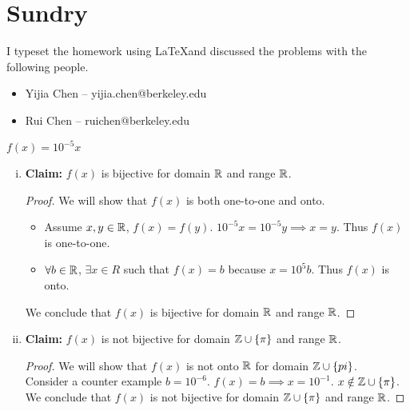 \documentclass[11pt]{article}
\begin{document}
\section*{Sundry}

\begin{Answer}
    I typeset the homework using \LaTeX and discussed the problems with the following people. 
    \begin{itemize}
        \item Yijia Chen -- yijia.chen@berkeley.edu
        \item Rui Chen -- ruichen@berkeley.edu
    \end{itemize}
\end{Answer}

\newpage
{}

\begin{Parts}
    \Part $f(x) = 10^{-5}x$
    \begin{Answer}
        \begin{enumerate}[(i)]
        \item \textbf{Claim:} $f(x)$ is bijective for domain $\mathbb{R}$ and range $\mathbb{R}$. 
            \begin{proof}
                We will show that $f(x)$ is both one-to-one and onto.
                \begin{itemize}
                    \item Assume $x,y \in \mathbb{R}$, $f(x)=f(y)$. $10^{-5}x=10^{-5}y \implies x=y$. Thus $f(x)$ is one-to-one.
                    \item $\forall b \in \mathbb{R}$, $\exists x \in R$ such that $f(x)=b$ because $x=10^5b$. Thus $f(x)$ is onto. 
                \end{itemize}
                We conclude that $f(x)$ is bijective for domain $\mathbb{R}$ and range $\mathbb{R}$. 
            \end{proof}
        \item \textbf{Claim:} $f(x)$ is not bijective for domain $\mathbb{Z} \cup \{\pi\}$ and range $\mathbb{R}$.
            \begin{proof}
                We will show that $f(x)$ is not onto $\mathbb{R}$ for domain $\mathbb{Z} \cup \{pi\}$. \\
                Consider a counter example $b=10^{-6}$. $f(x)=b \implies x=10^{-1}$. $x \notin \mathbb{Z} \cup \{\pi\}$. \\
                We conclude that $f(x)$ is not bijective for domain $\mathbb{Z} \cup \{\pi\}$ and range $\mathbb{R}$. 
            \end{proof}
        \end{enumerate}
    \end{Answer}


\end{Parts}
\end{document}
